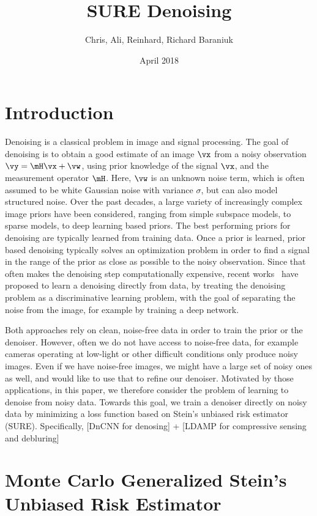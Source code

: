 \documentclass{article}
\title{SURE Denoising}
\author{Chris, Ali, Reinhard, Richard Baraniuk}
\date{April 2018}
\newcommand\img{\vx}
\newcommand\obs{\vy}
\newcommand\noise{\vw}
\begin{document}
\maketitle

\section{Introduction}
Denoising is a classical problem in image and signal processing.
The goal of denoising is to obtain a good estimate of an image $\img$ from a noisy observation
$\obs = \mH \img + \noise$, using prior knowledge of the signal $\img$, and the measurement operator $\mH$.
Here, $\noise$ is an unknown noise term, which is often assumed to be white Gaussian noise with variance $\sigma$, but can also model structured noise. 
Over the past decades, a large variety of increasingly complex image priors have been considered, ranging from simple subspace models, to sparse models, to deep learning based priors.
The best performing priors for denoising are typically learned from training data.
Once a prior is learned, prior based denoising typically solves an optimization problem in order to find a signal in the range of the prior as close as possible to the noisy observation.
Since that often makes the denoising step computationally expensive, recent works~\cite{zhang_beyond_2017,...} have proposed to learn a denoising directly from data, by treating the denoising problem as a discriminative learning problem, with the goal of separating the noise from the image, for example by training a deep network.

Both approaches rely on clean, noise-free data in order to train the prior or the denoiser. 
However, often we do not have access to noise-free data, for example cameras operating at low-light or other difficult conditions only produce noisy images. Even if we have noise-free images, we might have a large set of noisy ones as well, and would like to use that to refine our denoiser. 
Motivated by those applications, in this paper, we therefore consider the problem of learning to denoise from noisy data.
Towards this goal, we train a denoiser directly on noisy data by minimizing a loss function based on Stein’s unbiased risk estimator (SURE). 
Specifically, [DnCNN for denosing] + [LDAMP for compressive sensing and debluring]





\section{Monte Carlo Generalized Stein's Unbiased Risk Estimator}
\end{document}

